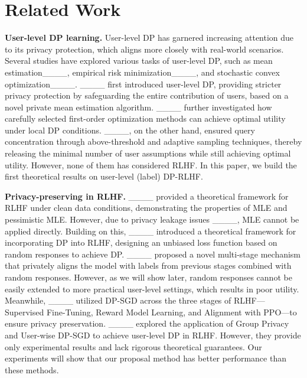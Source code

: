\section{Related Work}
\noindent \textbf{User-level DP learning. }
User-level DP has garnered increasing attention due to its privacy protection, which aligns more closely with real-world scenarios. Several studies have explored various tasks of user-level DP, such as mean estimation____, empirical risk minimization____, and stochastic convex optimization____. ____ first introduced user-level DP, providing stricter privacy protection by safeguarding the entire contribution of users, based on a novel private mean estimation algorithm. ____ further investigated how carefully selected first-order optimization methods can achieve optimal utility under local DP conditions. ____, on the other hand, ensured query concentration through above-threshold and adaptive sampling techniques, thereby releasing the minimal number of user assumptions while still achieving optimal utility. However, none of them has considered RLHF. In this paper, we build the first theoretical results on user-level (label) DP-RLHF. 

\noindent \textbf{Privacy-preserving in RLHF.}
____ provided a theoretical framework for RLHF under clean data conditions, demonstrating the properties of MLE and pessimistic MLE. However, due to privacy leakage issues ____, MLE cannot be applied directly. Building on this, ____ introduced a theoretical framework for incorporating DP into RLHF, designing an unbiased loss function based on random responses to achieve DP.   ____ proposed a novel multi-stage mechanism that privately aligns the model with labels from previous stages combined with random responses. However, as we will show later, random responses cannot be easily extended to more practical user-level settings, which results in poor utility. Meanwhile, ____ utilized DP-SGD across the three stages of RLHF—Supervised Fine-Tuning, Reward Model Learning, and Alignment with PPO—to ensure privacy preservation. ____ explored the application of Group Privacy and User-wise DP-SGD to achieve user-level DP in RLHF. However, they provide only experimental results and lack rigorous theoretical guarantees. Our experiments will show that our proposal method has better performance than these methods.  


